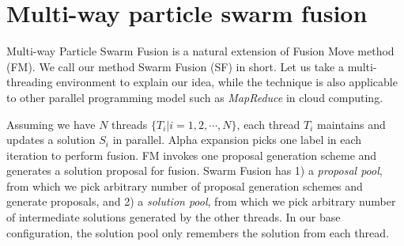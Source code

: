 \section{Multi-way particle swarm fusion}
Multi-way Particle Swarm Fusion is a natural extension of Fusion Move
method (FM). We call our method Swarm Fusion (SF) in short. Let us take
a multi-threading environment to explain our idea, while the technique
is also applicable to other parallel programming model such as {\it
MapReduce} in cloud computing.
%

Assuming we have $N$ threads $\{T_i | i=1, 2, \cdots, N\}$, each thread
$T_i$ maintains and updates a solution $S_i$ in parallel. Alpha
expansion picks one label in each iteration to perform fusion. FM
invokes one proposal generation scheme and generates a solution proposal
for fusion. Swarm Fusion has 1) a {\it proposal pool}, from which we
pick arbitrary number of proposal generation schemes and generate
proposals, and 2) a {\it solution pool}, from which we pick arbitrary
number of intermediate solutions generated by the other threads.
%
%
In our base configuration, the solution pool only remembers the solution
from each thread.

